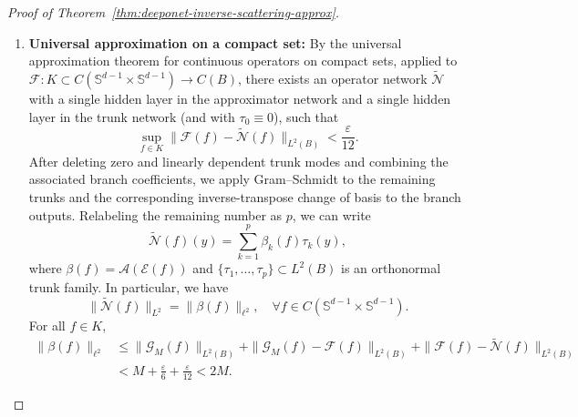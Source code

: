 \documentclass{article}
\numberwithin{equation}{section}
\theoremstyle{plain}
\begin{document}
\begin{proof}[Proof of Theorem~\ref{thm:deeponet-inverse-scattering-approx}]
\begin{enumerate}
			\item \textbf{Universal approximation on a compact set:}  
			By the universal approximation theorem for continuous operators on compact sets, applied to $\mathcal{F}: K \subset C(\mathbb{S}^{d-1} \times \mathbb{S}^{d-1}) \to C(B)$, there exists an operator network $\widetilde{\mathscr{N}}$ with a single hidden layer in the approximator network and a single hidden layer in the trunk network (and with $\tau_0 \equiv 0$), such that
			\begin{equation}
				\sup_{f \in K} \| \mathcal{F}(f) - \widetilde{\mathscr{N}}(f) \|_{L^2(B)} < \frac{\varepsilon}{12}. \label{eq:2.4}
			\end{equation}
			After deleting zero and linearly dependent trunk modes and combining the associated branch coefficients, we apply Gram--Schmidt to the remaining trunks and the corresponding inverse-transpose change of basis to the branch outputs. Relabeling the remaining number as $p$, we can write
			\begin{equation*}
				\widetilde{\mathscr{N}}(f)(y)
				=
				\sum_{k=1}^p \beta_k(f)\tau_k(y),
			\end{equation*}
			where $\beta(f)=\mathcal A(\mathcal E(f))$ and
			$\{\tau_1,\dots,\tau_p\}\subset L^2(B)$ is an orthonormal trunk family. In particular, we have
			\begin{equation*}
				\|\widetilde{\mathscr{N}}(f)\|_{L^2} = \|\beta(f)\|_{\ell^2}, \quad \forall f \in C(\mathbb{S}^{d-1} \times \mathbb{S}^{d-1}).
			\end{equation*}
			For all $f \in K$,
			\begin{equation*}
				\begin{aligned}
					\|\beta(f)\|_{\ell^2} 
					&\leq \|\mathscr{G}_M(f)\|_{L^2(B)} + \|\mathscr{G}_M(f) - \mathcal{F}(f)\|_{L^2(B)} + \|\mathcal{F}(f) - \widetilde{\mathscr{N}}(f)\|_{L^2(B)} \\ 
					&< M + \frac{\varepsilon}{6} + \frac{\varepsilon}{12} < 2M.
				\end{aligned}
			\end{equation*}
			

\end{enumerate}
\end{proof}
\end{document}
